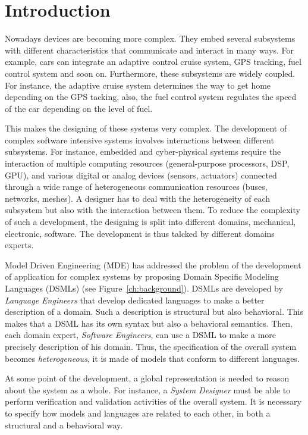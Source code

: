 \chapter{Introduction}	
Nowadays devices are becoming more complex. They embed several subsystems with different characteristics that communicate and interact in many ways. For example, cars can integrate an adaptive control cruise system, GPS tracking, fuel control system and soon on. Furthermore, these subsystems are widely coupled. For instance, the adaptive cruise system determines the way to get home depending on the GPS tacking, also, the fuel control system regulates the speed of the car depending on the level of fuel.

This makes the designing of these systems very complex. The development of complex software intensive systems involves interactions between different subsystems. For instance, embedded and cyber-physical systems require the interaction of multiple computing resources (general-purpose processors, DSP, GPU), and various digital or analog devices (sensors, actuators) connected through a wide range of heterogeneous communication resources (buses, networks, meshes).  A designer has to deal with the heterogeneity of each subsystem but also with the interaction between them. To reduce the complexity of such a development, the designing is split into different domains, \eg mechanical, electronic, software. The development is thus talcked by different domains experts.

Model Driven Engineering (MDE) has addressed the problem of the development of application for complex systems by proposing Domain Specific Modeling Languages (DSMLs) (see Figure~\ref{ch:background}). DSMLs are developed by \emph{Language Engineers} that develop dedicated languages to make a better description of a domain. Such a description is structural but also behavioral. This makes that a DSML has its own syntax but also a behavioral semantics. Then, each domain expert, \ie \emph{Software Engineers}, can use a DSML to make a more precisely description of his domain. Thus, the specification of the overall system becomes \emph{heterogeneous}, \ie it is made of models that conform to different languages.

At some point of the development, a global representation is needed to reason about the system as a whole. For instance, a \emph{System Designer} must be able to perform verification and validation activities of the overall system. It is necessary to specify how models and languages are related to each other, in both a structural and a behavioral way.

